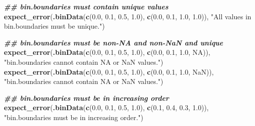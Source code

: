 \documentclass[
]{book}
\newenvironment{Shaded}{\begin{snugshade}}{\end{snugshade}}
\newcommand{\ConstantTok}[1]{\textcolor[rgb]{0.56,0.35,0.01}{#1}}
\newcommand{\DocumentationTok}[1]{\textcolor[rgb]{0.56,0.35,0.01}{\textbf{\textit{#1}}}}
\newcommand{\FloatTok}[1]{\textcolor[rgb]{0.00,0.00,0.81}{#1}}
\newcommand{\FunctionTok}[1]{\textcolor[rgb]{0.13,0.29,0.53}{\textbf{#1}}}
\newcommand{\NormalTok}[1]{#1}
\newcommand{\StringTok}[1]{\textcolor[rgb]{0.31,0.60,0.02}{#1}}
\begin{document}
\begin{Shaded}
\begin{Highlighting}[]
  \DocumentationTok{\#\# \textasciigrave{}bin.boundaries\textasciigrave{} must contain unique values}
  \FunctionTok{expect\_error}\NormalTok{(}\FunctionTok{.binData}\NormalTok{(}\FunctionTok{c}\NormalTok{(}\FloatTok{0.0}\NormalTok{, }\FloatTok{0.1}\NormalTok{, }\FloatTok{0.5}\NormalTok{, }\FloatTok{1.0}\NormalTok{), }\FunctionTok{c}\NormalTok{(}\FloatTok{0.0}\NormalTok{, }\FloatTok{0.1}\NormalTok{, }\FloatTok{1.0}\NormalTok{, }\FloatTok{1.0}\NormalTok{)),}
               \StringTok{"All values in \textasciigrave{}bin.boundaries\textasciigrave{} must be unique."}\NormalTok{)}
  
  \DocumentationTok{\#\# \textasciigrave{}bin.boundaries\textasciigrave{} must be non{-}NA and non{-}NaN and unique}
  \FunctionTok{expect\_error}\NormalTok{(}\FunctionTok{.binData}\NormalTok{(}\FunctionTok{c}\NormalTok{(}\FloatTok{0.0}\NormalTok{, }\FloatTok{0.1}\NormalTok{, }\FloatTok{0.5}\NormalTok{, }\FloatTok{1.0}\NormalTok{), }\FunctionTok{c}\NormalTok{(}\FloatTok{0.0}\NormalTok{, }\FloatTok{0.1}\NormalTok{, }\FloatTok{1.0}\NormalTok{, }\ConstantTok{NA}\NormalTok{)),}
               \StringTok{"\textasciigrave{}bin.boundaries\textasciigrave{} cannot contain NA or NaN values."}\NormalTok{)}
  \FunctionTok{expect\_error}\NormalTok{(}\FunctionTok{.binData}\NormalTok{(}\FunctionTok{c}\NormalTok{(}\FloatTok{0.0}\NormalTok{, }\FloatTok{0.1}\NormalTok{, }\FloatTok{0.5}\NormalTok{, }\FloatTok{1.0}\NormalTok{), }\FunctionTok{c}\NormalTok{(}\FloatTok{0.0}\NormalTok{, }\FloatTok{0.1}\NormalTok{, }\FloatTok{1.0}\NormalTok{, }\ConstantTok{NaN}\NormalTok{)),}
               \StringTok{"\textasciigrave{}bin.boundaries\textasciigrave{} cannot contain NA or NaN values."}\NormalTok{)}
  
  \DocumentationTok{\#\# \textasciigrave{}bin.boundaries\textasciigrave{} must be in increasing order}
  \FunctionTok{expect\_error}\NormalTok{(}\FunctionTok{.binData}\NormalTok{(}\FunctionTok{c}\NormalTok{(}\FloatTok{0.0}\NormalTok{, }\FloatTok{0.1}\NormalTok{, }\FloatTok{0.5}\NormalTok{, }\FloatTok{1.0}\NormalTok{), }\FunctionTok{c}\NormalTok{(}\FloatTok{0.1}\NormalTok{, }\FloatTok{0.4}\NormalTok{, }\FloatTok{0.3}\NormalTok{, }\FloatTok{1.0}\NormalTok{)),}
               \StringTok{"\textasciigrave{}bin.boundaries\textasciigrave{} must be in increasing order."}\NormalTok{)}
  

\end{Highlighting}
\end{Shaded}
\end{document}
